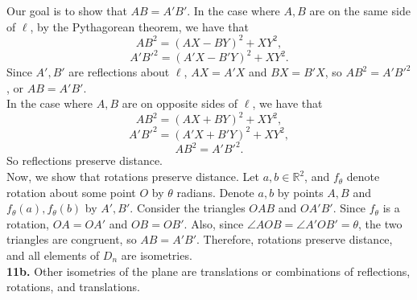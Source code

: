 \documentclass{article}
\newcommand{\R}{\mathbb{R}}
\begin{document}
Our goal is to show that $AB = A'B'$. In the case where $A, B$ are on the same side of $\ell$, by the Pythagorean theorem, we have that
$$AB^2 = (AX - BY)^2 + XY^2,$$
$$A'B'^2 = (A'X - B'Y)^2 + XY^2.$$
Since $A', B'$ are reflections about $\ell$, $AX = A'X$ and $BX = B'X$, so $AB^2 = A'B'^2$, or $AB = A'B'$. \\

In the case where $A, B$ are on opposite sides of $\ell$, we have that
$$AB^2 = (AX + BY)^2 + XY^2,$$
$$A'B'^2 = (A'X + B'Y)^2 + XY^2,$$
$$AB^2 = A'B'^2.$$
So reflections preserve distance. \\

Now, we show that rotations preserve distance. Let $a, b \in \R^2$, and $f_\theta$ denote rotation about some point $O$ by $\theta$ radians. Denote $a, b$ by points $A, B$ and $f_\theta(a), f_\theta(b)$ by $A', B'$. Consider the triangles $OAB$ and $OA'B'$. Since $f_\theta$ is a rotation, $OA = OA'$ and $OB = OB'$. Also, since $\angle AOB = \angle A'OB' = \theta$, the two triangles are congruent, so $AB = A'B'$. Therefore, rotations preserve distance, and all elements of $D_n$ are isometries. \\

\textbf{11b.} Other isometries of the plane are translations or combinations of reflections, rotations, and translations.
\end{document}
